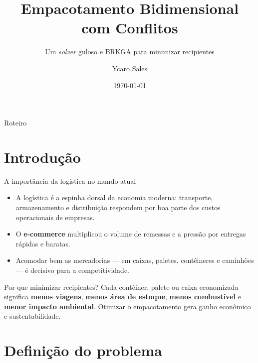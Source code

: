 \documentclass[aspectratio=169]{beamer}
\title[Empacotamento 2D com Conflitos]{Empacotamento Bidimensional com Conflitos}
\subtitle{Um \textit{solver} guloso e BRKGA para minimizar recipientes}
\author{Ycaro Sales}
\date{\today}
\begin{document}
\frame{\titlepage}

\begin{frame}{Roteiro}
  \tableofcontents
\end{frame}

\section{Introdução}

\begin{frame}{A importância da logística no mundo atual}
  \begin{itemize}
    \item A logística é a espinha dorsal da economia moderna: transporte,
          armazenamento e distribuição respondem por boa parte dos custos
          operacionais de empresas.
    \item O \textbf{e-commerce} multiplicou o volume de remessas e a pressão por
          entregas rápidas e baratas.
    \item Acomodar bem as mercadorias --- em caixas, paletes, contêineres e
          caminhões --- é decisivo para a competitividade.
  \end{itemize}
  \vspace{0.5em}
  \begin{block}{Por que minimizar recipientes?}
    Cada contêiner, palete ou caixa economizada significa \textbf{menos
    viagens}, \textbf{menos área de estoque}, \textbf{menos combustível} e
    \textbf{menor impacto ambiental}. Otimizar o empacotamento gera ganho
    econômico e sustentabilidade.
  \end{block}
\end{frame}

\section{Definição do problema}
\end{document}
